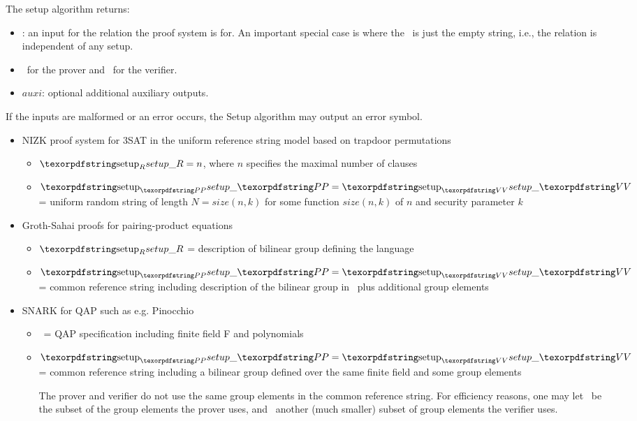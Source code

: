 The setup algorithm returns:

\begin{itemize}
\item \setR: an input for the relation the proof system is for. 
An important special case is where the \setR\ is just the empty string, i.e., the relation is independent of any setup.
\item \setP\ for the prover and \setV\ for the verifier.
\item $auxi$: optional additional auxiliary outputs.
\end{itemize}

If the inputs are malformed or an error occurs, the Setup algorithm may output an error symbol.


\begin{itemize}

\item NIZK proof system for 3SAT in the uniform reference string model based on trapdoor permutations
	\begin{itemize}
	\item $\setR = n$, where $n$ specifies the maximal number of clauses
	\item $\setP = \setV$ = uniform random string of length $N = size(n,k)$ for some function $size(n,k)$ of $n$ and security parameter $k$
	\end{itemize}

\item Groth-Sahai proofs for pairing-product equations
	\begin{itemize}
	\item $\setR$ = description of bilinear group defining the language
	\item $\setP = \setV$ = common reference string including description of the bilinear group in \setR\ plus additional group elements
	\end{itemize}

\item SNARK for QAP such as e.g. Pinocchio
	\begin{itemize}
	\item \setR\ = QAP specification including finite field F and polynomials
	\item $\setP = \setV$ = common reference string including a bilinear group defined over the same finite field and some group elements

The prover and verifier do not use the same group elements in the common reference string. For efficiency reasons, one may let \setP\ be the subset of the group elements the prover uses, and \setV\ another (much smaller) subset of group elements the verifier uses.\loosen
	\end{itemize}


\end{itemize}
